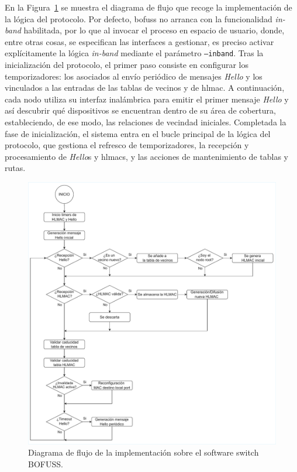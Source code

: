 En la Figura~\ref{fig:in_band_6} se muestra el diagrama de flujo que recoge la implementación de la lógica del protocolo. Por defecto, \gls{bofuss} no arranca con la funcionalidad \emph{in-band} habilitada, por lo que al invocar el proceso en espacio de usuario, donde, entre otras cosas, se especifican las interfaces a gestionar, es preciso activar explícitamente la lógica \emph{in-band} mediante el parámetro \texttt{--inband}. Tras la inicialización del protocolo, el primer paso consiste en configurar los temporizadores: los asociados al envío periódico de mensajes \textit{Hello} y los vinculados a las entradas de las tablas de vecinos y de \gls{hlmac}. A continuación, cada nodo utiliza su interfaz inalámbrica para emitir el primer mensaje \textit{Hello} y así descubrir qué dispositivos se encuentran dentro de su área de cobertura, estableciendo, de ese modo, las relaciones de vecindad iniciales. Completada la fase de inicialización, el sistema entra en el bucle principal de la lógica del protocolo, que gestiona el refresco de temporizadores, la recepción y procesamiento de \textit{Hello}s y \gls{hlmac}s, y las acciones de mantenimiento de tablas y rutas.

\begin{figure}[ht!]
    \centering
    \includegraphics[width=\textwidth]{fig/04_in-band/in_band_6.drawio.pdf}
    \caption{Diagrama de flujo de la implementación sobre el software switch BOFUSS.} 
    \label{fig:in_band_6}
\end{figure}

